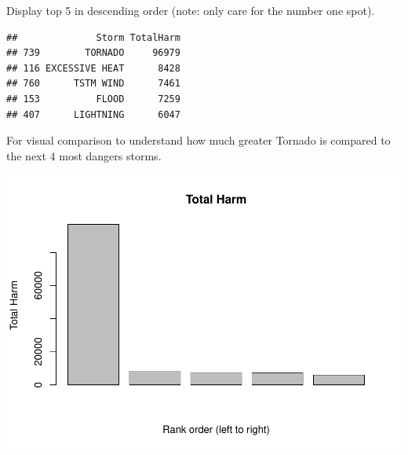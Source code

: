 \documentclass[]{article}
\newenvironment{Shaded}{\begin{snugshade}}{\end{snugshade}}
\newcommand{\KeywordTok}[1]{\textcolor[rgb]{0.13,0.29,0.53}{\textbf{{#1}}}}
\newcommand{\DataTypeTok}[1]{\textcolor[rgb]{0.13,0.29,0.53}{{#1}}}
\newcommand{\DecValTok}[1]{\textcolor[rgb]{0.00,0.00,0.81}{{#1}}}
\newcommand{\StringTok}[1]{\textcolor[rgb]{0.31,0.60,0.02}{{#1}}}
\newcommand{\NormalTok}[1]{{#1}}
\begin{document}
Display top 5 in descending order (note: only care for the number one
spot).

\begin{Shaded}
\end{Shaded}

\begin{verbatim}
##              Storm TotalHarm
## 739        TORNADO     96979
## 116 EXCESSIVE HEAT      8428
## 760      TSTM WIND      7461
## 153          FLOOD      7259
## 407      LIGHTNING      6047
\end{verbatim}

For visual comparison to understand how much greater Tornado is compared
to the next 4 most dangers storms.

\begin{Shaded}
\end{Shaded}

\includegraphics{pa2_files/figure-latex/unnamed-chunk-8-1.pdf}
\end{document}
